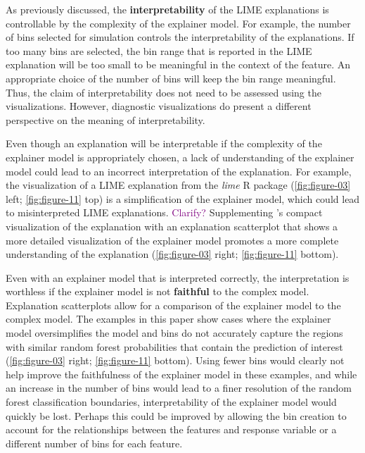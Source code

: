 \documentclass[AMS,STIX2COL]{WileyNJD-v2}\usepackage[]{graphicx}\usepackage[]{color}
\newcommand{\kgc}[1]{\textcolor{purple}{#1}}
\begin{document}
As previously discussed, the \textbf{interpretability} of the LIME explanations is controllable by the complexity of the explainer model. For example, the number of bins selected for simulation controls the interpretability of the explanations. If too many bins are selected, the bin range that is reported in the LIME explanation will be too small to be meaningful in the context of the feature. An appropriate choice of the number of bins will keep the bin range meaningful. Thus, the claim of interpretability does not need to be assessed using the visualizations. However, diagnostic visualizations do present a different perspective on the meaning of interpretability.

Even though an explanation will be interpretable if  the complexity of the explainer model is appropriately chosen, a lack of understanding of the explainer model could lead to an incorrect interpretation of the explanation. For example, the visualization of a LIME explanation from the \emph{lime} R package \citep{pedersen:2020} (\autoref{fig:figure-03} left; \autoref{fig:figure-11} top) is a simplification of the explainer model, which could lead to misinterpreted LIME explanations. \kgc{Clarify?} Supplementing \citet{pedersen:2020}'s compact visualization of the explanation with an explanation scatterplot that shows a more detailed visualization of the explainer model promotes a more complete understanding of the explanation (\autoref{fig:figure-03} right; \autoref{fig:figure-11} bottom).

Even with an explainer model that is interpreted correctly, the interpretation is worthless if the explainer model is not \textbf{faithful} to the complex model. Explanation scatterplots allow for a comparison of the explainer model to the complex model. The examples in this paper show cases where the explainer model oversimplifies the model and bins do not accurately capture the regions with similar random forest probabilities that contain the prediction of interest (\autoref{fig:figure-03} right; \autoref{fig:figure-11} bottom). Using fewer bins would clearly not help improve the faithfulness of the explainer model in these examples, and while an increase in the number of bins would lead to a finer resolution of the random forest classification boundaries, interpretability of the explainer model would quickly be lost. Perhaps this could be improved by allowing the bin creation to account for the relationships between the features and response variable or a different number of bins for each feature.
\end{document}
